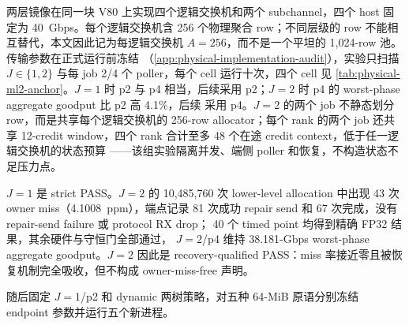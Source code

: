 两层镜像在同一块 V80 上实现四个逻辑交换机和两个 subchannel，四个
host 固定为 40~Gbps。每个逻辑交换机含 256 个物理聚合 row；不同层级的
row 不能相互替代，本文因此记为每逻辑交换机 $A=256$，而不是一个平坦的
1,024-row 池。传输参数在正式运行前冻结
（\cref{app:physical-implementation-audit}），实验只扫描
$J\in\{1,2\}$ 与每 job 2/4 个 poller，每个 cell 运行十次，四个 cell
见 \cref{tab:physical-ml2-anchor}。$J=1$ 时 p2 与 p4 相当，后续采用
p2；$J=2$ 时 p4 的 worst-phase aggregate goodput 比 p2 高 4.1\%，后续
采用 p4。$J=2$ 的两个 job 不静态划分 row，而是共享每个逻辑交换机的
256-row allocator；每个 rank 的两个 job 还共享 12-credit window，四个
rank 合计至多 48 个在途 credit context，低于任一逻辑交换机的状态预算
——该组实验隔离并发、端侧 poller 和恢复，不构造状态不足压力点。

\begin{table}[t]
\centering
\small
\caption{物理两级数据路径锚点。每格为十次正式重复的中位数；
$J=1$ 报告单 job goodput，$J=2$ 的斜线两侧对应两种 overlap 顺序。
加粗行为后续采用的 poller 配置。}
\label{tab:physical-ml2-anchor}
\setlength{\tabcolsep}{3.5pt}
\end{table}

$J=1$ 是 strict PASS。$J=2$ 的 10,485,760 次 lower-level allocation
中出现 43 次 owner miss（4.1008~ppm），端点记录 81 次成功 repair
send 和 67 次完成，没有 repair-send failure 或 protocol RX drop；
40 个 timed point 均得到精确 FP32 结果，其余硬件与守恒门全部通过，
$J=2$/p4 维持 38.181-Gbps worst-phase aggregate goodput。$J=2$ 因此是
recovery-qualified PASS：miss 率接近零且被恢复机制完全吸收，但不构成
owner-miss-free 声明。

随后固定 $J=1$/p2 和 dynamic 两树策略，对五种 64-MiB 原语分别冻结
endpoint 参数并运行五个新进程。

